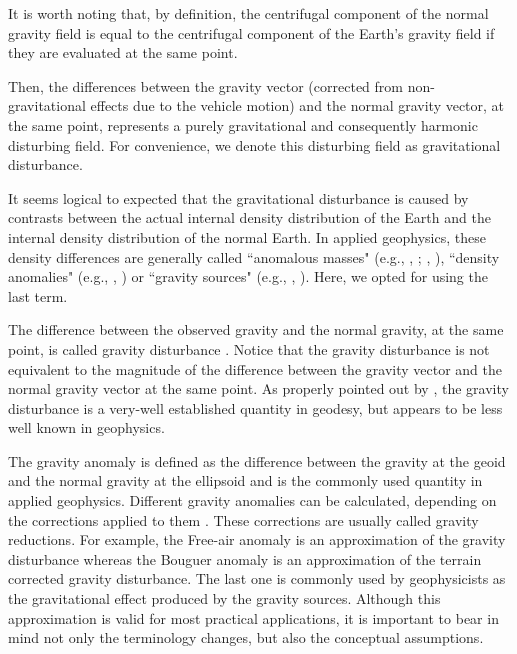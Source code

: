 \documentclass[manuscript]{geophysics}
\begin{document}
It is worth noting that, by definition, 
the centrifugal component of the normal gravity field is
equal to the centrifugal component of the Earth's gravity
field if they are evaluated at the same point.


Then, the differences between the gravity vector
(corrected from non-gravitational effects due to the vehicle motion) 
and the normal gravity vector, at the same point, represents a purely 
gravitational and consequently harmonic disturbing field.
For convenience, we denote this disturbing field as
gravitational disturbance.


It seems logical to expected that the gravitational disturbance 
is caused by contrasts between the actual internal 
density distribution of the Earth and the internal density 
distribution of the normal Earth.
In applied geophysics, these density differences are generally 
called ``anomalous masses" (e.g., \citeauthor{hammer1945}, 
\citeyear{hammer1945}; \citeauthor{lafehr1965}, \citeyear{lafehr1965}),
``density anomalies" (e.g., \citeauthor{forsberg1984}, \citeyear{forsberg1984})
or ``gravity sources" (e.g., \citeauthor{blakely1996}, 
\citeyear{blakely1996}). Here, we opted for using the last term.


The difference between the observed gravity and the
normal gravity, at the same point, is called gravity disturbance
\citep{hofmann-wellenhof-moritz2005}.
Notice that the gravity disturbance is not equivalent to the
magnitude of the difference between the gravity vector
and the normal gravity vector at the same point.
As properly pointed out by \citet{hackney-featherstone2003},
the gravity disturbance is a very-well established quantity in geodesy,
but appears to be less well known in geophysics.


The gravity anomaly is defined as the difference
between the gravity at the geoid and the normal gravity at the ellipsoid
and is the commonly used quantity in applied geophysics.
Different gravity anomalies can be calculated, depending on the
corrections applied to them \citep{blakely1996, hofmann-wellenhof-moritz2005}.
These corrections are usually called gravity reductions.
For example, the Free-air anomaly is an approximation of the
gravity disturbance whereas the Bouguer anomaly
is an approximation of the terrain corrected gravity disturbance.
The last one is commonly used by geophysicists as the
gravitational effect produced by the gravity sources.
Although this approximation is valid for most practical applications,
it is important to bear in mind not only the terminology 
changes, but also the conceptual assumptions.
\end{document}
